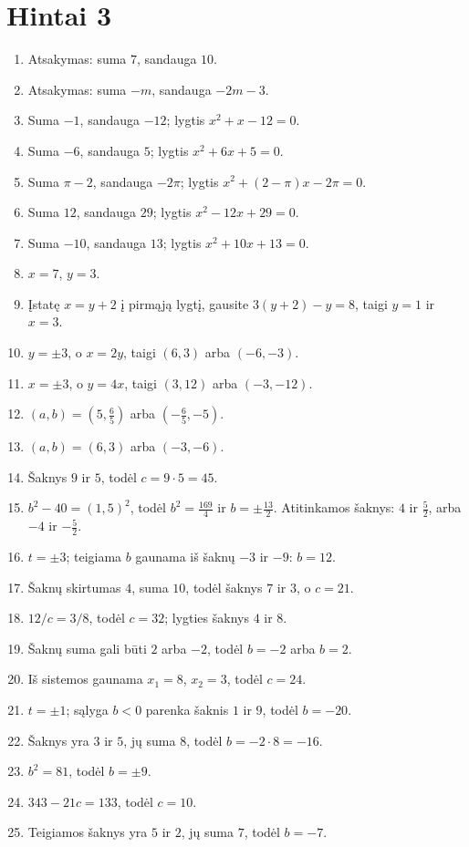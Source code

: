 \documentclass[11pt,a4paper]{scrartcl}
\begin{document}
\newpage
\section{Hintai 3}

\begin{enumerate}[label=\textbf{\arabic*.}, leftmargin=*]
    \item Atsakymas: suma $7$, sandauga $10$.
    \item Atsakymas: suma $-m$, sandauga $-2m-3$.
    \item Suma $-1$, sandauga $-12$; lygtis $x^2+x-12=0$.
    \item Suma $-6$, sandauga $5$; lygtis $x^2+6x+5=0$.
    \item Suma $\pi-2$, sandauga $-2\pi$; lygtis $x^2+(2-\pi)x-2\pi=0$.
    \item Suma $12$, sandauga $29$; lygtis $x^2-12x+29=0$.
    \item Suma $-10$, sandauga $13$; lygtis $x^2+10x+13=0$.
    \item $x=7$, $y=3$.
    \item Įstatę $x=y+2$ į pirmąją lygtį, gausite $3(y+2)-y=8$, taigi $y=1$ ir $x=3$.
    \item $y=\pm3$, o $x=2y$, taigi $(6,3)$ arba $(-6,-3)$.
    \item $x=\pm3$, o $y=4x$, taigi $(3,12)$ arba $(-3,-12)$.
    \item $(a,b)=\left(5,\frac65\right)$ arba $\left(-\frac65,-5\right)$.
    \item $(a,b)=(6,3)$ arba $(-3,-6)$.
    \item Šaknys $9$ ir $5$, todėl $c=9\cdot5=45$.
    \item $b^2-40=(1{,}5)^2$, todėl $b^2=\frac{169}{4}$ ir $b=\pm\frac{13}{2}$. Atitinkamos šaknys: $4$ ir $\frac52$, arba $-4$ ir $-\frac52$.
    \item $t=\pm3$; teigiama $b$ gaunama iš šaknų $-3$ ir $-9$: $b=12$.
    \item Šaknų skirtumas $4$, suma $10$, todėl šaknys $7$ ir $3$, o $c=21$.
    \item $12/c=3/8$, todėl $c=32$; lygties šaknys $4$ ir $8$.
    \item Šaknų suma gali būti $2$ arba $-2$, todėl $b=-2$ arba $b=2$.
    \item Iš sistemos gaunama $x_1=8$, $x_2=3$, todėl $c=24$.
    \item $t=\pm1$; sąlyga $b<0$ parenka šaknis $1$ ir $9$, todėl $b=-20$.
    \item Šaknys yra $3$ ir $5$, jų suma $8$, todėl $b=-2\cdot8=-16$.
    \item $b^2=81$, todėl $b=\pm9$.
    \item $343-21c=133$, todėl $c=10$.
    \item Teigiamos šaknys yra $5$ ir $2$, jų suma $7$, todėl $b=-7$.
\end{enumerate}
\end{document}
